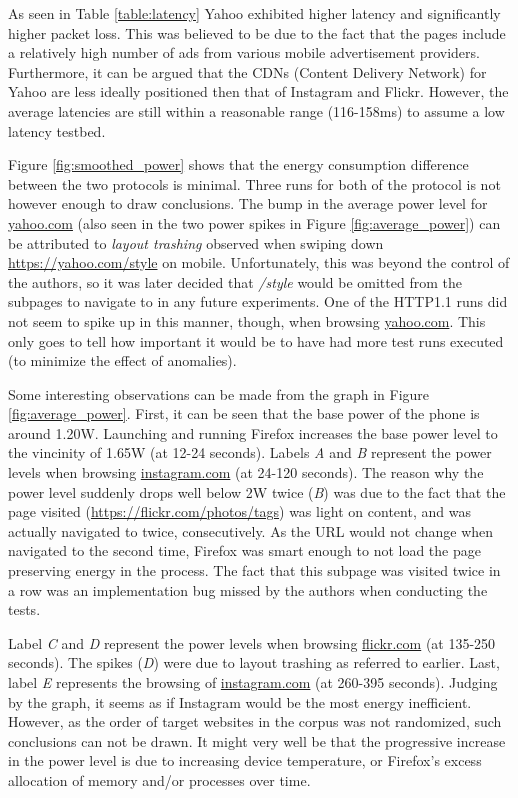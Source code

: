 \documentclass{article}
\begin{document}
As seen in Table \ref{table:latency} Yahoo exhibited higher latency and significantly higher packet loss. This was believed to be due to the fact that the pages include a relatively high number of ads from various mobile advertisement providers. Furthermore, it can be argued that the CDNs (Content Delivery Network) for Yahoo are less ideally positioned then that of Instagram and Flickr. However, the average latencies are still within a reasonable range (116-158ms) to assume a low latency testbed.

Figure \ref{fig:smoothed_power} shows that the energy consumption difference between the two protocols is minimal. Three runs for both of the protocol is not however enough to draw conclusions. The bump in the average power level for \url{yahoo.com} (also seen in the two power spikes in Figure \ref{fig:average_power}) can be attributed to \emph{layout trashing} observed when swiping down \url{https://yahoo.com/style} on mobile. Unfortunately, this was beyond the control of the authors, so it was later decided that \emph{/style} would be omitted from the subpages to navigate to in any future experiments. One of the HTTP1.1 runs did not seem to spike up in this manner, though, when browsing \url{yahoo.com}. This only goes to tell how important it would be to have had more test runs executed (to minimize the effect of anomalies).

Some interesting observations can be made from the graph in Figure \ref{fig:average_power}. First, it can be seen that the base power of the phone is around 1.20W. Launching and running Firefox increases the base power level to the vincinity of 1.65W (at 12-24 seconds). Labels \emph{A}  and \emph{B} represent the power levels when browsing \url{instagram.com} (at 24-120 seconds). The reason why the power level suddenly drops well below 2W twice (\emph{B}) was due to the fact that the page visited (\url{https://flickr.com/photos/tags}) was light on content, and was actually navigated to twice, consecutively. As the URL would not change when navigated to the second time, Firefox was smart enough to not load the page preserving energy in the process. The fact that this subpage was visited twice in a row was an implementation bug missed by the authors when conducting the tests.

Label \emph{C} and \emph{D} represent the power levels when browsing \url{flickr.com} (at 135-250 seconds). The spikes (\emph{D}) were due to layout trashing as referred to earlier. Last, label \emph{E} represents the browsing of \url{instagram.com} (at 260-395 seconds). Judging by the graph, it seems as if Instagram would be the most energy inefficient. However, as the order of target websites in the corpus was not randomized, such conclusions can not be drawn. It might very well be that the progressive increase in the power level is due to increasing device temperature, or Firefox's excess allocation of memory and/or processes over time.
\end{document}
